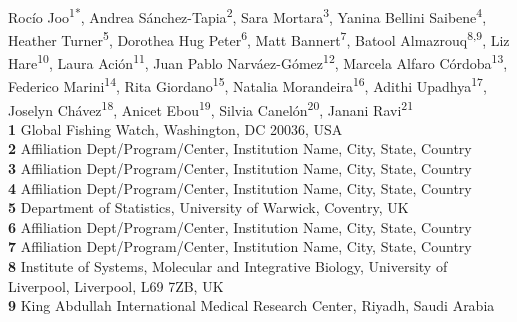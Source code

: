 \documentclass[10pt,letterpaper]{article}
\begin{document}
\vspace*{0.2in}

\begin{flushleft}
{\Large
\textbf{} %
}
\newline
\\
Rocío Joo\textsuperscript{1*\Yinyang}, 
Andrea Sánchez-Tapia\textsuperscript{2\Yinyang},
Sara Mortara\textsuperscript{3},
Yanina Bellini Saibene\textsuperscript{4},
Heather Turner\textsuperscript{5}, %
Dorothea Hug Peter\textsuperscript{6}, %
Matt Bannert\textsuperscript{7},
Batool Almazrouq\textsuperscript{8,9},
Liz Hare\textsuperscript{10},
Laura Ación\textsuperscript{11},
Juan Pablo Narváez-Gómez\textsuperscript{12},
Marcela Alfaro Córdoba\textsuperscript{13},
Federico Marini\textsuperscript{14},
Rita Giordano\textsuperscript{15},
Natalia Morandeira\textsuperscript{16},
Adithi Upadhya\textsuperscript{17},
Joselyn Chávez\textsuperscript{18},
Anicet Ebou\textsuperscript{19},
Silvia Canelón\textsuperscript{20},
Janani Ravi\textsuperscript{21}
\\
\bigskip
\textbf{1} Global Fishing Watch, Washington, DC 20036, USA
\\
\textbf{2} Affiliation Dept/Program/Center, Institution Name, City, State, Country
\\
\textbf{3} Affiliation Dept/Program/Center, Institution Name, City, State, Country
\\
\textbf{4} Affiliation Dept/Program/Center, Institution Name, City, State, Country
\\
\textbf{5} Department of Statistics, University of Warwick, Coventry, UK
\\
\textbf{6} Affiliation Dept/Program/Center, Institution Name, City, State, Country
\\
\textbf{7} Affiliation Dept/Program/Center, Institution Name, City, State, Country
\\
\textbf{8} Institute of Systems, Molecular and Integrative Biology, University of Liverpool, Liverpool, L69 7ZB, UK
\\
\textbf{9} King Abdullah International Medical Research Center, Riyadh, Saudi Arabia

\end{flushleft}
\end{document}

